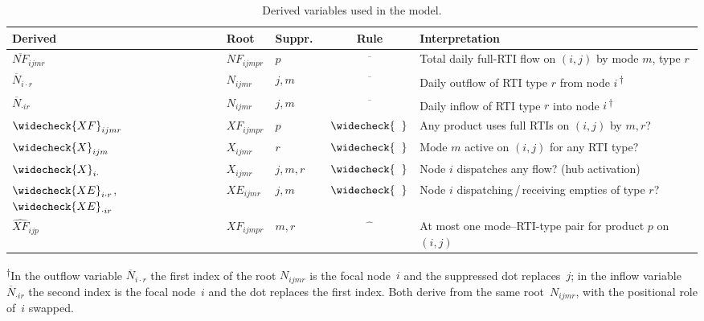 \begin{table}[ht]
\centering
\caption{Derived variables used in the model.}
\label{tab:notation-examples}
\small
\begin{tabular}{@{}lllcl@{}}
\toprule
Derived & Root & Suppr.\ & Rule & Interpretation \\
\midrule
$\overline{NF}_{ijmr}$
  & $NF_{ijmpr}$ & $p$
  & $\overline{\phantom{x}}$
  & Total daily full-RTI flow on $(i,j)$ by mode $m$, type $r$ \\[3pt]
$\overline{N}_{i\cdot r}$
  & $N_{ijmr}$ & $j,m$
  & $\overline{\phantom{x}}$
  & Daily outflow of RTI type $r$ from node $i$\,\textsuperscript{$\dagger$} \\[3pt]
$\overline{N}_{\cdot ir}$
  & $N_{ijmr}$ & $j,m$
  & $\overline{\phantom{x}}$
  & Daily inflow of RTI type $r$ into node $i$\,\textsuperscript{$\dagger$} \\[3pt]
$\widecheck{XF}_{ijmr}$
  & $XF_{ijmpr}$ & $p$
  & $\widecheck{\phantom{x}}$
  & Any product uses full RTIs on $(i,j)$ by $m,r$? \\[3pt]
$\widecheck{X}_{ijm}$
  & $X_{ijmr}$ & $r$
  & $\widecheck{\phantom{x}}$
  & Mode $m$ active on $(i,j)$ for any RTI type? \\[3pt]
$\widecheck{X}_{i\cdot}$
  & $X_{ijmr}$ & $j,m,r$
  & $\widecheck{\phantom{x}}$
  & Node $i$ dispatches any flow? (hub activation) \\[3pt]
$\widecheck{XE}_{i\cdot r}$,\;
$\widecheck{XE}_{\cdot ir}$
  & $XE_{ijmr}$ & $j,m$
  & $\widecheck{\phantom{x}}$
  & Node $i$ dispatching\,/\,receiving empties of type $r$? \\[3pt]
$\widehat{XF}_{ijp}$
  & $XF_{ijmpr}$ & $m,r$
  & $\widehat{\phantom{x}}$
  & At most one mode--RTI-type pair for product $p$ on $(i,j)$ \\
\bottomrule
\end{tabular}

\smallskip
\noindent\textsuperscript{$\dagger$}In the outflow variable
$\overline{N}_{i\cdot r}$ the first index of the root $N_{ijmr}$ is
the focal node~$i$ and the suppressed dot replaces~$j$; in the inflow
variable $\overline{N}_{\cdot ir}$ the second index is the focal
node~$i$ and the dot replaces the first index. Both derive from the
same root~$N_{ijmr}$, with the positional role of~$i$ swapped.
\end{table}

